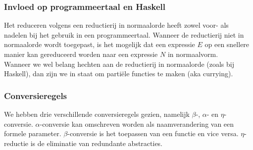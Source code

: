 \subsubsection*{Invloed op programmeertaal en Haskell}

Het reduceren volgens een reductierij in normaalorde heeft zowel voor- als nadelen bij het gebruik in een programmeertaal. Wanneer de reductierij niet in normaalorde wordt toegepast, is het mogelijk dat een expressie $E$ op een snellere manier kan gereduceerd worden naar een expressie $N$ in normaalvorm.\\

Wanneer we wel belang hechten aan de reductierij in normaalorde (zoals bij Haskell), dan zijn we in staat om parti\"ele functies te maken (aka currying).

\subsubsection*{Conversieregels}

We hebben drie verschillende conversieregels gezien, namelijk $\beta$-, $\alpha$- en $\eta$-conversie. $\alpha$-conversie kan omschreven worden als naamverandering van een formele parameter. $\beta$-conversie is het toepassen van een functie en vice versa. $\eta$-reductie is de eliminatie van redundante abstracties.
